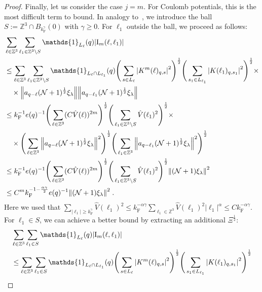 \documentclass[12pt,a4paper]{article}
\numberwithin{equation}{section}
\newcommand{\1}{\mathbb{I}}
\newcommand{\F}{\mathrm{F}}
\newcommand{\I}{\mathrm{I}}
\newcommand{\kF}{k_\F}
\newcommand{\Zstar}{\mathbb{Z}^3} %
\newcommand{\Z}{\mathbb{Z}}
\newcommand{\NN}{\mathcal{N}}
\newcommand{\half}{\frac{1}{2}}
\theoremstyle{plain}
\theoremstyle{definition}
\theoremstyle{remark}
\theoremstyle{plain}
\theoremstyle{definition}
\theoremstyle{remark}
\begin{document}
\begin{proof}
Finally, let us consider the case $ j = m $. For Coulomb potentials, this is the most difficult term to bound. In analogy to~\cite{CHN24}, we introduce the ball $ S := \Zstar \cap B_{\kF^{\gamma}}(0) $ with $ \gamma \ge 0 $. For $ \ell_1 $ outside the ball, we proceed as follows:
\begin{align}
	&\sum_{\ell \in \Zstar} \sum_{\ell_1 \in \Zstar \setminus S} \mathds{1}_{L_\ell}(q) |\I_m(\ell, \ell_1)| \nonumber\\
	&\leq \sum_{\ell \in \Zstar} \sum_{\ell_1 \in \Zstar \setminus S} \mathds{1}_{L_\ell \cap L_{\ell_1}}(q) \Bigg(\sum\limits_{s \in L_{\ell}} \abs{K^m(\ell)_{q,s}}^2\Bigg)^\half
		\Bigg(\sum\limits_{s_1 \in L_{\ell_1}} \abs{K(\ell_1)_{q,s_1}}^2\Bigg)^\half \times \nonumber \\
	& \quad \times \norm{ a_{q-\ell} (\NN+1)^{\half} \xi_\lambda}
		\norm{ a_{q-\ell_1} (\NN+1)^{\half} \xi_\lambda }\nonumber\\
	&\leq \kF^{-1} e(q)^{-1}
		\Bigg( \sum_{\ell \in \Zstar} (C \hat{V}(\ell))^{2m} \Bigg)^{\half}
		\Bigg( \sum_{\ell_1 \in \Zstar \setminus S} \hat{V}(\ell_1)^2 \Bigg)^{\half} \times \nonumber \\
	& \quad \times 
		\Bigg( \sum_{\ell \in \Zstar} \norm{ a_{q-\ell} (\NN+1)^{\half} \xi_\lambda}^2 \Bigg)^{\half}
		\Bigg( \sum_{\ell_1 \in \Zstar} \norm{ a_{q-\ell_1} (\NN+1)^{\half} \xi_\lambda }^2 \Bigg)^{\half} \nonumber\\
	&\leq \kF^{-1} e(q)^{-1}
		\Bigg( \sum_{\ell \in \Zstar} (C \hat{V}(\ell))^{2m} \Bigg)^{\half}
		\Bigg( \sum_{\ell_1 \in \Zstar \setminus S} \hat{V}(\ell_1)^2 \Bigg)^{\half} \norm{(\NN+1) \xi_\lambda}^2 \nonumber\\
	&\leq C^m \kF^{-1-\frac{\alpha \gamma}{2}} e(q)^{-1}
		\norm{(\NN+1) \xi_\lambda}^2 \;. \label{eq:estEQ2113_Coulomb_1}
\end{align}
Here we used that $ \sum_{|\ell_1| \ge \kF^\gamma} \hat{V}(\ell_1)^2 \le \kF^{-\alpha \gamma} \sum_{\ell_1 \in \Zstar} \hat{V}(\ell_1)^2 |\ell_1|^\alpha \le C \kF^{-\alpha \gamma} $.
For $ \ell_1 \in S $, we can achieve a better bound by extracting an additional $ \Xi^{\half} $:
\begin{align}
	&\sum_{\ell \in \Zstar} \sum_{\ell_1 \in S} \mathds{1}_{L_\ell}(q) |\I_m(\ell, \ell_1)| \nonumber\\
	&\leq \sum_{\ell \in \Zstar} \sum_{\ell_1 \in S} \mathds{1}_{L_\ell \cap L_{\ell_1}}(q) \Bigg(\sum\limits_{s \in L_{\ell}} \abs{K^m(\ell)_{q,s}}^2\Bigg)^\half
		\Bigg(\sum\limits_{s_1 \in L_{\ell_1}} \abs{K(\ell_1)_{q,s_1}}^2\Bigg)^\half

\end{align}
\end{proof}
\end{document}
